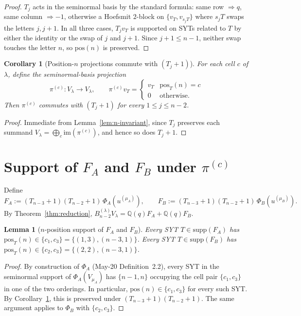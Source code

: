 \documentclass[11pt]{article}
\newtheorem{lemma}[theorem]{Lemma}
\newtheorem{corollary}[theorem]{Corollary}
\theoremstyle{definition}
\begin{document}
\begin{proof}
$T_j$ acts in the seminormal basis by the standard formula: same
row $\Rightarrow q$, same column $\Rightarrow -1$, otherwise a
Hoefsmit $2$-block on $\{v_T, v_{s_j T}\}$ where $s_j T$ swaps the
letters $j, j+1$. In all three cases, $T_j v_T$ is supported on
SYTs related to $T$ by either the identity or the swap of $j$ and
$j+1$. Since $j+1 \le n-1$, neither swap touches the letter $n$,
so $\mathrm{pos}(n)$ is preserved.
\end{proof}

\begin{corollary}[Position-$n$ projections commute with $(T_j{+}1)$]\label{cor:proj-commute}
For each cell $c$ of $\lambda$, define the seminormal-basis
projection
\[
   \pi^{(c)}: V_\lambda \to V_\lambda,
   \qquad
   \pi^{(c)} v_T = \begin{cases} v_T & \mathrm{pos}_T(n) = c \\ 0 & \text{otherwise.}
   \end{cases}
\]
Then $\pi^{(c)}$ commutes with $(T_j{+}1)$ for every $1 \le j \le n-2$.
\end{corollary}

\begin{proof}
Immediate from Lemma~\ref{lem:n-invariant}, since $T_j$ preserves
each summand $V_\lambda = \bigoplus_c \mathrm{im}(\pi^{(c)})$, and
hence so does $T_j + 1$.
\end{proof}

\section{Support of $F_A$ and $F_B$ under $\pi^{(c)}$}\label{sec:supports}

Define
\[
   F_A := (T_{n-3}{+}1)(T_{n-2}{+}1)\,\Phi_A(u^{(\mu_A)}),
   \qquad
   F_B := (T_{n-3}{+}1)(T_{n-2}{+}1)\,\Phi_B(u^{(\mu_B)}).
\]
By Theorem~\ref{thm:reduction}, $B_{n-2}^{(\lambda)} V_\lambda = \mathbb{Q}(q) F_A + \mathbb{Q}(q) F_B$.

\begin{lemma}[$n$-position support of $F_A$ and $F_B$]\label{lem:supp-FA-FB}
Every SYT $T \in \mathrm{supp}(F_A)$ has $\mathrm{pos}_T(n)
\in \{c_1, c_3\} = \{(1,3), (n-3,1)\}$.
Every SYT $T \in \mathrm{supp}(F_B)$ has $\mathrm{pos}_T(n)
\in \{c_2, c_3\} = \{(2,2), (n-3,1)\}$.
\end{lemma}

\begin{proof}
By construction of $\Phi_A$ (May-20 Definition~2.2), every SYT in
the seminormal support of $\Phi_A(V_{\mu_A})$ has $\{n-1, n\}$
occupying the cell pair $\{c_1, c_3\}$ in one of the two orderings.
In particular, $\mathrm{pos}(n) \in \{c_1, c_3\}$ for every such SYT.
By Corollary~\ref{cor:proj-commute}, this is preserved under
$(T_{n-3}{+}1)(T_{n-2}{+}1)$. The same argument applies to $\Phi_B$
with $\{c_2, c_3\}$.
\end{proof}
\end{document}
